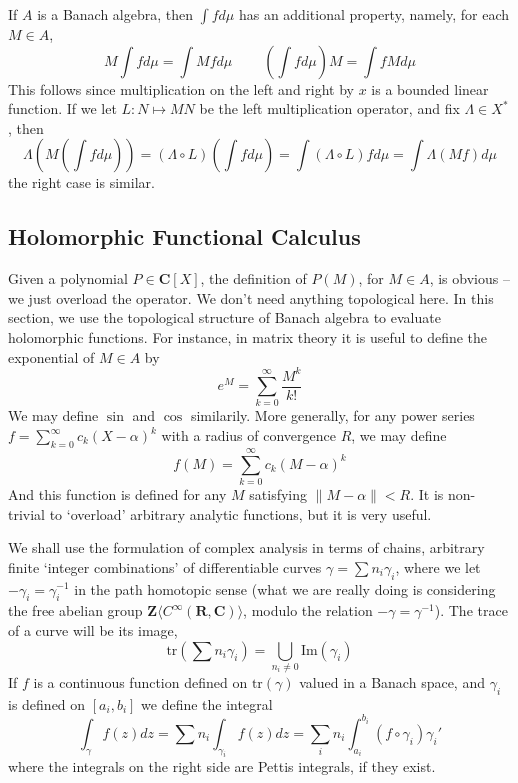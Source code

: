 If $A$ is a Banach algebra, then $\int f d\mu$ has an additional property, namely, for each $M \in A$,
%
\[ M \int f d\mu = \int Mf d\mu\ \ \ \ \ \ \ \ \ \ \left(\int f d\mu\right) M = \int fM d\mu \]
%
This follows since multiplication on the left and right by $x$ is a bounded linear function. If we let $L: N \mapsto MN$ be the left multiplication operator, and fix $\Lambda \in X^*$, then
%
\[ \Lambda \left( M \left( \int f d\mu \right) \right) = (\Lambda \circ L) \left( \int f d\mu \right) = \int (\Lambda \circ L) f d\mu = \int \Lambda(Mf) d\mu \]
%
the right case is similar.





\subsection{Holomorphic Functional Calculus}

Given a polynomial $P \in \mathbf{C}[X]$, the definition of $P(M)$, for $M \in A$, is obvious -- we just overload the operator. We don't need anything topological here. In this section, we use the topological structure of Banach algebra to evaluate holomorphic functions. For instance, in matrix theory it is useful to define the exponential of $M \in A$ by
%
\[ e^M = \sum_{k = 0}^\infty \frac{M^k}{k!} \]
%
We may define $\sin$ and $\cos$ similarily. More generally, for any power series $f = \sum_{k = 0}^\infty c_k (X - \alpha)^k$ with a radius of convergence $R$, we may define
%
\[ f(M) = \sum_{k = 0}^\infty c_k (M - \alpha)^k \]
%
And this function is defined for any $M$ satisfying $\|M - \alpha \| < R$. It is non-trivial to `overload' arbitrary analytic functions, but it is very useful.

We shall use the formulation of complex analysis in terms of chains, arbitrary finite `integer combinations' of differentiable curves $\gamma = \sum n_i \gamma_i$, where we let $- \gamma_i = \gamma_i^{-1}$ in the path homotopic sense (what we are really doing is considering the free abelian group $\mathbf{Z}\langle C^\infty(\mathbf{R}, \mathbf{C}) \rangle$, modulo the relation $- \gamma = \gamma^{-1}$). The trace of a curve will be its image,
%
\[ \text{tr}(\sum n_i \gamma_i) = \bigcup_{n_i \neq 0} \text{Im}(\gamma_i) \]
%
If $f$ is a continuous function defined on $\text{tr}(\gamma)$ valued in a Banach space, and $\gamma_i$ is defined on $[a_i, b_i]$ we define the integral
%
\[ \int_\gamma f(z) dz = \sum n_i \int_{\gamma_i} f(z) dz = \sum_i n_i \int_{a_i}^{b_i} (f \circ \gamma_i) \gamma_i' \]
%
where the integrals on the right side are Pettis integrals, if they exist.

